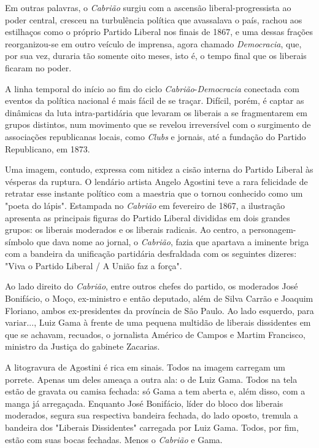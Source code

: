 Em outras palavras, o \emph{Cabrião} surgiu com a ascensão
liberal-progressista ao poder central, cresceu na turbulência política
que avassalava o país, rachou aos estilhaços como o próprio Partido
Liberal nos finais de 1867, e uma dessas frações reorganizou-se em outro
veículo de imprensa, agora chamado \emph{Democracia}, que, por sua vez,
duraria tão somente oito meses, isto é, o tempo final que os liberais
ficaram no poder.

A linha temporal do início ao fim do ciclo
\emph{Cabrião}-\emph{Democracia} conectada com eventos da política
nacional é mais fácil de se traçar. Difícil, porém, é captar as
dinâmicas da luta intra-partidária que levaram os liberais a se
fragmentarem em grupos distintos, num movimento que se revelou
irreversível com o surgimento de associações republicanas locais, como
\emph{Clubs} e jornais, até a fundação do Partido Republicano, em 1873.

Uma imagem, contudo, expressa com nitidez a cisão interna do Partido
Liberal às vésperas da ruptura. O lendário artista Angelo Agostini teve
a rara felicidade de retratar esse instante político com a maestria que
o tornou conhecido como um "poeta do lápis". Estampada no \emph{Cabrião}
em fevereiro de 1867, a ilustração apresenta as principais figuras do
Partido Liberal divididas em dois grandes grupos: os liberais moderados
e os liberais radicais. Ao centro, a personagem-símbolo que dava nome ao
jornal, o \emph{Cabrião}, fazia que apartava a iminente briga com a
bandeira da unificação partidária desfraldada com os seguintes dizeres:
"Viva o Partido Liberal / A União faz a força".

Ao lado direito do \emph{Cabrião}, entre outros chefes do partido, os
moderados José Bonifácio, o Moço, ex-ministro e então deputado, além de
Silva Carrão e Joaquim Floriano, ambos ex-presidentes da província de
São Paulo. Ao lado esquerdo, para variar..., Luiz Gama à frente de uma
pequena multidão de liberais dissidentes em que se achavam, recuados, o
jornalista Américo de Campos e Martim Francisco, ministro da Justiça do
gabinete Zacarias.

A litogravura de Agostini é rica em sinais. Todos na imagem carregam um
porrete. Apenas um deles ameaça a outra ala: o de Luiz Gama. Todos na
tela estão de gravata ou camisa fechada: só Gama a tem aberta e, além
disso, com a manga já arregaçada. Enquanto José Bonifácio, líder do
bloco dos liberais moderados, segura sua respectiva bandeira fechada, do
lado oposto, tremula a bandeira dos "Liberais Dissidentes" carregada por
Luiz Gama. Todos, por fim, estão com suas bocas fechadas. Menos o
\emph{Cabrião} e Gama.

